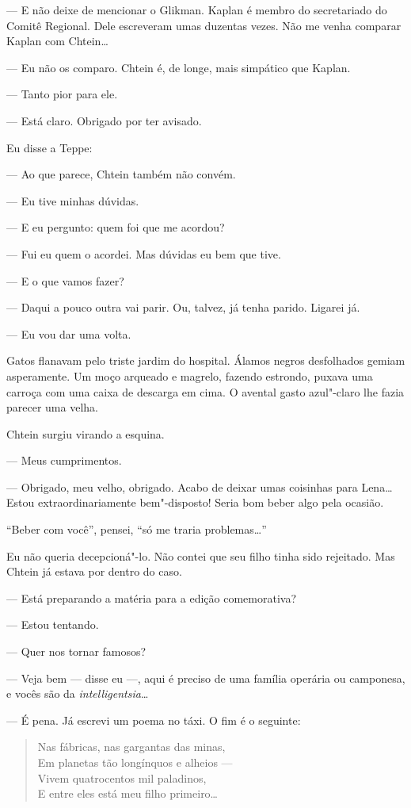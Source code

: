 --- E não deixe de mencionar o Glikman. Kaplan é membro do secretariado
do Comitê Regional. Dele escreveram umas duzentas vezes. Não me venha
comparar Kaplan com Chtein\ldots{}

--- Eu não os comparo. Chtein é, de longe, mais simpático que Kaplan.

--- Tanto pior para ele.

--- Está claro. Obrigado por ter avisado.

Eu disse a Teppe:

--- Ao que parece, Chtein também não convém.

--- Eu tive minhas dúvidas.

--- E eu pergunto: quem foi que me acordou?

--- Fui eu quem o acordei. Mas dúvidas eu bem que tive.

--- E o que vamos fazer?

--- Daqui a pouco outra vai parir. Ou, talvez, já tenha parido. Ligarei
já.

--- Eu vou dar uma volta.

Gatos flanavam pelo triste jardim do hospital. Álamos negros desfolhados
gemiam asperamente. Um moço arqueado e magrelo, fazendo estrondo, puxava
uma carroça com uma caixa de descarga em cima. O avental gasto
azul"-claro lhe fazia parecer uma velha.

Chtein surgiu virando a esquina.

--- Meus cumprimentos.

--- Obrigado, meu velho, obrigado. Acabo de deixar umas coisinhas para
Lena\ldots{} Estou extraordinariamente bem"-disposto! Seria bom beber algo
pela ocasião.

``Beber com você'', pensei, ``só me traria problemas\ldots{}''

Eu não queria decepcioná"-lo. Não contei que seu filho tinha sido
rejeitado. Mas Chtein já estava por dentro do caso.

--- Está preparando a matéria para a edição comemorativa?

--- Estou tentando.

--- Quer nos tornar famosos?

--- Veja bem --- disse eu ---, aqui é preciso de uma família operária ou
camponesa, e vocês são da \emph{intelligentsia}\ldots{}

--- É pena. Já escrevi um poema no táxi. O fim é o seguinte:

\begin{verse}
Nas fábricas, nas gargantas das minas,\\
Em planetas tão longínquos e alheios ---\\
Vivem quatrocentos mil paladinos,\\
E entre eles está meu filho primeiro\ldots{}
\end{verse}

